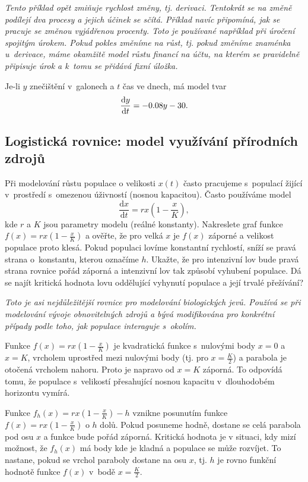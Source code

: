\textit{Tento příklad opět zmiňuje rychlost změny, tj. derivaci. Tentokrát se na změně podílejí dva procesy a jejich účinek se sčítá. Příklad navíc připomíná, jak se pracuje se změnou vyjádřenou procenty. Toto je používané například při úročení spojitým úrokem. Pokud pokles změníme na růst, tj. pokud změníme
  znaménka u derivace, máme okamžitě model růstu financí na účtu, na kterém se pravidelně připisuje úrok a k tomu se přidává fixní úložka.}

\reseni Je-li $y$ znečištění v galonech a $t$ čas ve dnech, má model tvar
$$\frac{\mathrm dy}{\mathrm dt}=-0.08y-30.$$

\konec



\subsection{Logistická rovnice: model využívání přírodních zdrojů}
Při modelování růstu populace o velikosti $x(t)$ často pracujeme s populací žijící v prostředí s omezenou úživností (nosnou kapacitou). Často používáme model
$$\frac{\mathrm d x}{\mathrm dt}=rx\left(1-\frac xK\right),$$
kde $r$ a $K$ jsou parametry modelu (reálné konstanty).  Nakreslete
graf funkce $f(x)=rx\left(1-\frac xK\right)$ a ověřte, že pro velká
$x$ je $f(x)$ záporné a velikost populace proto klesá. Pokud populaci
lovíme konstantní rychlostí, sníží se pravá strana o konstantu, kterou
označíme $h$. Ukažte, že pro intenzivní lov bude pravá strana rovnice
pořád záporná a intenzivní lov tak způsobí vyhubení populace. Dá se
najít kritická hodnota lovu oddělující vyhynutí populace a její
trvalé přežívání?

\textit{Toto je asi nejdůležitější rovnice pro modelování biologických jevů. Používá se při modelování vývoje obnovitelných zdrojů a bývá modifikována pro konkrétní případy podle toho, jak populace interaguje s okolím.}

\reseni
Funkce $f(x)=rx\left(1-\frac xK\right)$ je kvadratická funkce s nulovými body $x=0$ a $x=K$, vrcholem uprostřed mezi nulovými body (tj. pro $x=\frac K2$) a parabola je otočená vrcholem nahoru. Proto je napravo od $x=K$ záporná. To odpovídá tomu, že populace s velikostí přesahující nosnou kapacitu v dlouhodobém horizontu vymírá.

Funkce $f_h(x)=rx\left(1-\frac xK\right)-h$ vznikne posunutím funkce $f(x)=rx\left(1-\frac xK\right)$ o $h$ dolů. Pokud posuneme hodně, dostane se celá parabola pod osu $x$ a funkce bude pořád záporná. Kritická hodnota je v situaci, kdy mizí možnost, že $f_h(x)$ má body kde je kladná a populace se může rozvíjet. To nastane,  pokud se vrchol paraboly dostane na osu $x$, tj. $h$ je rovno funkční hodnotě funkce $f(x)$ v bodě $x=\frac K2.$
\konec



